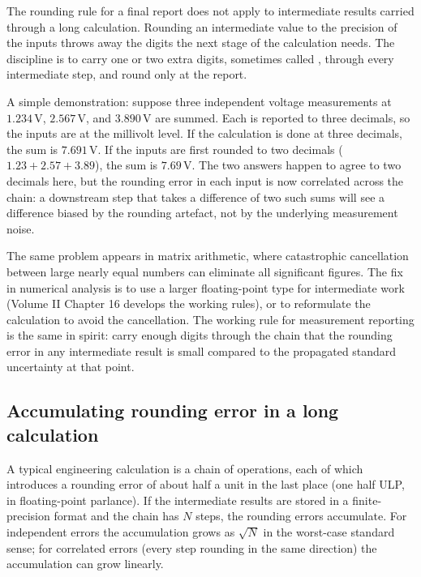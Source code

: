 The rounding rule for a final report does not apply to intermediate
results carried through a long calculation. Rounding an intermediate
value to the precision of the inputs throws away the digits the
next stage of the calculation needs. The discipline is to carry one
or two extra digits, sometimes called ,
through every intermediate step, and round only at the report.

A simple demonstration: suppose three independent voltage
measurements at $1.234\,\si{\volt}$, $2.567\,\si{\volt}$, and
$3.890\,\si{\volt}$ are summed. Each is reported to three decimals,
so the inputs are at the millivolt level. If the calculation is
done at three decimals, the sum is $7.691\,\si{\volt}$. If the
inputs are first rounded to two decimals ($1.23 + 2.57 + 3.89$),
the sum is $7.69\,\si{\volt}$. The two answers happen to agree to
two decimals here, but the rounding error in each input is now
correlated across the chain: a downstream step that takes a
difference of two such sums will see a difference biased by the
rounding artefact, not by the underlying measurement noise.

The same problem appears in matrix arithmetic, where catastrophic
cancellation between large nearly equal numbers can eliminate all
significant figures. The fix in numerical analysis is to use a
larger floating-point type for intermediate work (Volume II Chapter
16 develops the working rules), or to reformulate the calculation
to avoid the cancellation. The working rule for measurement
reporting is the same in spirit: carry enough digits through the
chain that the rounding error in any intermediate result is small
compared to the propagated standard uncertainty at that point.

\subsection{Accumulating rounding error in a long calculation}

A typical engineering calculation is a chain of operations, each of
which introduces a rounding error of about half a unit in the last
place (one half ULP, in floating-point parlance). If the
intermediate results are stored in a finite-precision format and
the chain has $N$ steps, the rounding errors accumulate. For
independent errors the accumulation grows as $\sqrt{N}$ in the
worst-case standard sense; for correlated errors (every step
rounding in the same direction) the accumulation can grow linearly.

